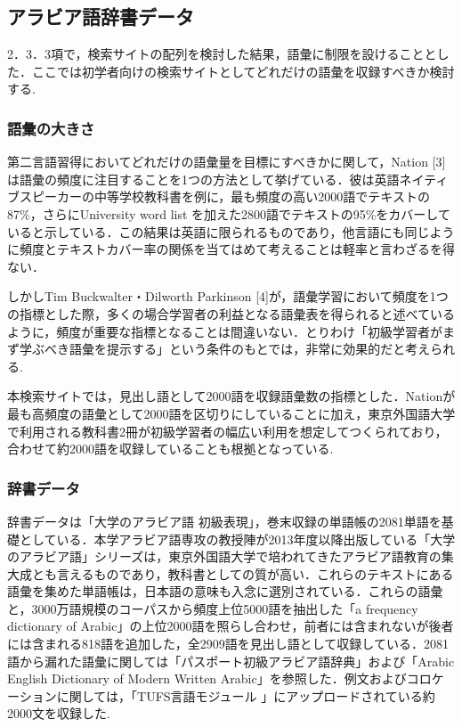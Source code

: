 \documentclass[technicalreport]{ieicej}
\begin{document}
\subsection{アラビア語辞書データ}
2．3．3項で，検索サイトの配列を検討した結果，語彙に制限を設けることとした．ここでは初学者向けの検索サイトとしてどれだけの語彙を収録すべきか検討する.

\subsubsection{語彙の大きさ}
第二言語習得においてどれだけの語彙量を目標にすべきかに関して，Nation [3]は語彙の頻度に注目することを1つの方法として挙げている．彼は英語ネイティブスピーカーの中等学校教科書を例に，最も頻度の高い2000語でテキストの87\%，さらにUniversity word list を加えた2800語でテキストの95\%をカバーしていると示している．この結果は英語に限られるものであり，他言語にも同じように頻度とテキストカバー率の関係を当てはめて考えることは軽率と言わざるを得ない．

しかしTim Buckwalter・Dilworth Parkinson [4]が，語彙学習において頻度を1つの指標とした際，多くの場合学習者の利益となる語彙表を得られると述べているように，頻度が重要な指標となることは間違いない．とりわけ「初級学習者がまず学ぶべき語彙を提示する」という条件のもとでは，非常に効果的だと考えられる.

本検索サイトでは，見出し語として2000語を収録語彙数の指標とした．Nationが最も高頻度の語彙として2000語を区切りにしていることに加え，東京外国語大学で利用される教科書2冊が初級学習者の幅広い利用を想定してつくられており，合わせて約2000語を収録していることも根拠となっている.

\subsubsection{辞書データ}
辞書データは「大学のアラビア語 初級表現」，巻末収録の単語帳の2081単語を基礎としている．本学アラビア語専攻の教授陣が2013年度以降出版している「大学のアラビア語」シリーズは，東京外国語大学で培われてきたアラビア語教育の集大成とも言えるものであり，教科書としての質が高い．これらのテキストにある語彙を集めた単語帳は，日本語の意味も入念に選別されている．これらの語彙と，3000万語規模のコーパスから頻度上位5000語を抽出した「a frequency dictionary of Arabic」の上位2000語を照らし合わせ，前者には含まれないが後者には含まれる818語を追加した，全2909語を見出し語として収録している．2081語から漏れた語彙に関しては「パスポート初級アラビア語辞典」および「Arabic English Dictionary of Modern Written Arabic」を参照した．例文およびコロケーションに関しては，「TUFS言語モジュール 」にアップロードされている約2000文を収録した.
\end{document}
